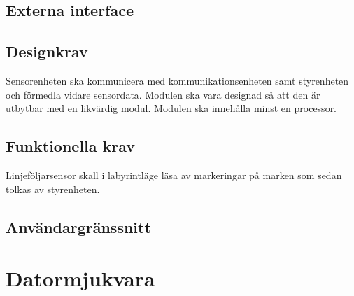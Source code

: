 \documentclass[a4paper,12pt]{article}
\begin{document}
\subsection{Externa interface}
\begin{LIPSkravlista}
\end{LIPSkravlista}

\subsection{Designkrav}
Sensorenheten ska kommunicera med kommunikationsenheten samt 
styrenheten och förmedla vidare sensordata.
Modulen ska vara designad så att den är utbytbar med en likvärdig modul. Modulen ska innehålla minst en processor.


\begin{LIPSkravlista}
\end{LIPSkravlista}

\subsection{Funktionella krav}
Linjeföljarsensor skall i labyrintläge läsa av markeringar på marken som sedan tolkas av styrenheten.


\begin{LIPSkravlista}
\end{LIPSkravlista} 

\subsection{Användargränssnitt}
\begin{LIPSkravlista}
\end{LIPSkravlista}


\section{Datormjukvara}
\end{document}
